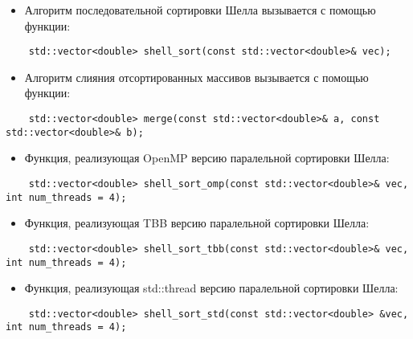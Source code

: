 \documentclass{report}
\begin{document}
\begin{itemize}
\item Алгоритм последовательной сортировки Шелла вызывается с помощью функции:
\end{itemize}
\begin{lstlisting}
	std::vector<double> shell_sort(const std::vector<double>& vec);
\end{lstlisting}
\begin{itemize}
\item Алгоритм слияния отсортированных массивов вызывается с помощью функции: 
\end{itemize}
\begin{lstlisting}
	std::vector<double> merge(const std::vector<double>& a, const std::vector<double>& b);
\end{lstlisting}
\begin{itemize}
\item Функция, реализующая OpenMP версию паралельной сортировки Шелла: 
\end{itemize}
\begin{lstlisting}
	std::vector<double> shell_sort_omp(const std::vector<double>& vec, int num_threads = 4);
\end{lstlisting}
\begin{itemize}
\item Функция, реализующая TBB версию паралельной сортировки Шелла: 
\end{itemize}
\begin{lstlisting}
	std::vector<double> shell_sort_tbb(const std::vector<double>& vec, int num_threads = 4);
\end{lstlisting}
\begin{itemize}
\item Функция, реализующая std::thread версию паралельной сортировки Шелла: 
\end{itemize}
\begin{lstlisting}
	std::vector<double> shell_sort_std(const std::vector<double> &vec, int num_threads = 4);
\end{lstlisting}
\newpage

\end{document}
